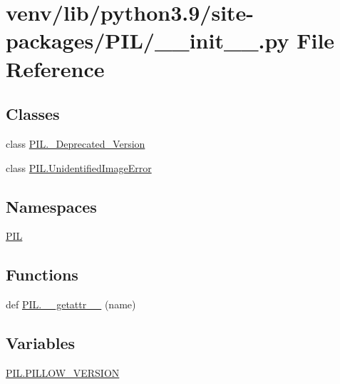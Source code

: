 \hypertarget{venv_2lib_2python3_89_2site-packages_2PIL_2____init_____8py}{}\section{venv/lib/python3.9/site-\/packages/\+P\+I\+L/\+\_\+\+\_\+init\+\_\+\+\_\+.py File Reference}
\label{venv_2lib_2python3_89_2site-packages_2PIL_2____init_____8py}
\subsection*{Classes}
\begin{DoxyCompactItemize}
\item 
class \hyperlink{classPIL_1_1__Deprecated__Version}{P\+I\+L.\+\_\+\+Deprecated\+\_\+\+Version}
\item 
class \hyperlink{classPIL_1_1UnidentifiedImageError}{P\+I\+L.\+Unidentified\+Image\+Error}
\end{DoxyCompactItemize}
\subsection*{Namespaces}
\begin{DoxyCompactItemize}
\item 
 \hyperlink{namespacePIL}{P\+IL}
\end{DoxyCompactItemize}
\subsection*{Functions}
\begin{DoxyCompactItemize}
\item 
def \hyperlink{namespacePIL_ad8131a49e60cdb3194904207d772f0a0}{P\+I\+L.\+\_\+\+\_\+getattr\+\_\+\+\_\+} (name)
\end{DoxyCompactItemize}
\subsection*{Variables}
\begin{DoxyCompactItemize}
\item 
\hyperlink{namespacePIL_a94f62ae0de6146836b1733922670906c}{P\+I\+L.\+P\+I\+L\+L\+O\+W\+\_\+\+V\+E\+R\+S\+I\+ON}
\end{DoxyCompactItemize}
